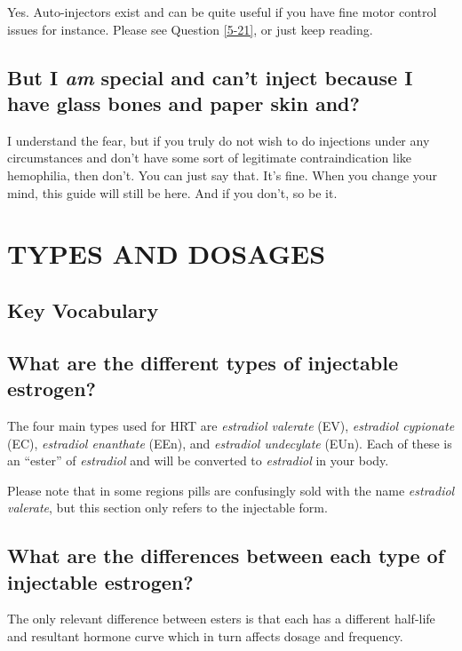 \documentclass{article}
\begin{document}
Yes. Auto-injectors exist and can be quite useful if you have fine motor control issues for instance. Please see Question \ref{5-21}, or just keep reading.

\subsection{But I \textit{am} special and can’t inject because I have glass bones and paper skin and\textemdash{}?}

I understand the fear, but if you truly do not wish to do injections under any circumstances and don’t have some sort of legitimate contraindication like hemophilia, then don’t. You can just say that. It’s fine. When you change your mind, this guide will still be here. And if you don’t, so be it. 

 

\section{TYPES AND DOSAGES}\label{td}

\subsection*{Key Vocabulary}

\subsection{What are the different types of injectable estrogen?}

The four main types used for HRT are \textit{estradiol valerate} (EV), \textit{estradiol cypionate} (EC), \textit{estradiol enanthate} (EEn), and \textit{estradiol undecylate} (EUn). Each of these is an “ester” of \textit{estradiol} and will be converted to \textit{estradiol} in your body. 

Please note that in some regions pills are confusingly sold with the name \textit{estradiol valerate}, but this section only refers to the injectable form.

\subsection{What are the differences between each type of injectable estrogen?}

The only relevant difference between esters is that each has a different half-life and resultant hormone curve which in turn affects dosage and frequency.
\end{document}
